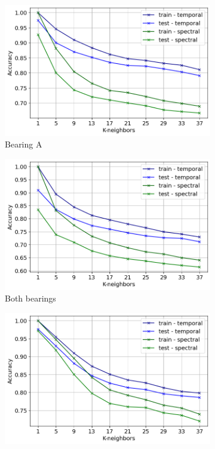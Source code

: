 \documentclass{llncs}
\begin{document}
\begin{figure}
     \begin{subfigure}[b]{0.32\textwidth}
         \centering
         \includegraphics[width=\textwidth]{fig/all-features-mafaulda/all-axis-a-bearing.png}
         \caption{Bearing A}
     \end{subfigure}
     \hfill
     \begin{subfigure}[b]{0.32\textwidth}
         \centering
         \includegraphics[width=\textwidth]{fig/all-features-mafaulda/all-axis-all-bearings.png}
         \caption{Both bearings}
     \end{subfigure}
     \hfill
     \begin{subfigure}[b]{0.32\textwidth}
         \centering
         \includegraphics[width=\textwidth]{fig/all-features-mafaulda/all-axis-severity.png}

\end{subfigure}
\end{figure}
\end{document}
